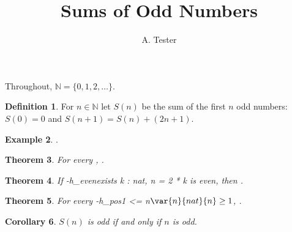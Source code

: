 \documentclass[11pt]{article}
\title{Sums of Odd Numbers}
\author{A. Tester}
\date{}
\newtheorem{thm}{Theorem}
\newtheorem{cor}[thm]{Corollary}
\theoremstyle{definition}
\newtheorem{definition}[thm]{Definition}
\newtheorem{example}[thm]{Example}
\begin{document}
\maketitle

Throughout, $\mathbb{N} = \{0, 1, 2, \dots\}$.

\begin{definition}
For $n \in \mathbb{N}$ let $S(n)$ be the sum of the first $n$ odd numbers:
$S(0) = 0$ and $S(n+1) = S(n) + (2n+1)$.
\end{definition}

\begin{example}
.
\end{example}

\begin{thm}\label{thm:sq}
For every , .
\end{thm}

\begin{thm}\label{thm:even}
If \hyp{h_even}{exists k : nat, n = 2 * k}{ is even}, then .
\end{thm}

\begin{thm}\label{thm:diff}
For every \hyp{h_pos}{1 <= n}{$\var{n}{nat}{n} \geq 1$}, .
\end{thm}

\begin{cor}
$S(n)$ is odd if and only if $n$ is odd.
\end{cor}
\end{document}
